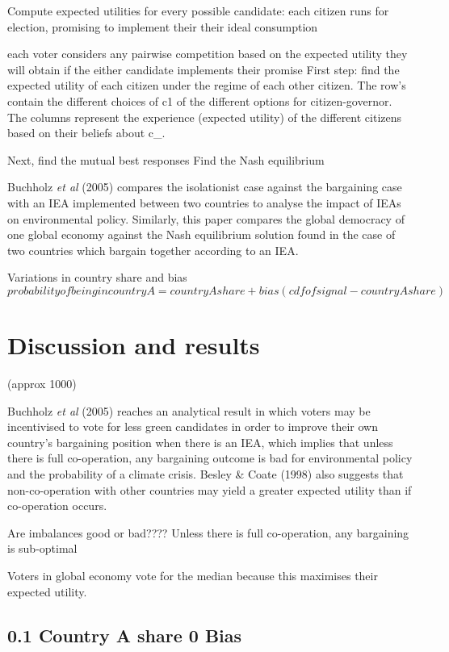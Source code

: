 \documentclass[11pt,preprint, authoryear]{elsarticle}
\numberwithin{equation}{section}
\numberwithin{figure}{section}
\numberwithin{table}{section}
\begin{document}
Compute expected utilities for every possible candidate: each citizen
runs for election, promising to implement their their ideal consumption

each voter considers any pairwise competition based on the expected
utility they will obtain if the either candidate implements their
promise First step: find the expected utility of each citizen under the
regime of each other citizen. The row's contain the different choices of
c1 of the different options for citizen-governor. The columns represent
the experience (expected utility) of the different citizens based on
their beliefs about c\_.

Next, find the mutual best responses Find the Nash equilibrium

Buchholz \emph{et al} (2005) compares the isolationist case against the
bargaining case with an IEA implemented between two countries to analyse
the impact of IEAs on environmental policy. Similarly, this paper
compares the global democracy of one global economy against the Nash
equilibrium solution found in the case of two countries which bargain
together according to an IEA.

Variations in country share and bias
\[probability of being in country A = country A share + bias(cdf of signal - country A share)\]

\hypertarget{discussion-and-results}{%
\section{Discussion and results}\label{discussion-and-results}}

(approx 1000)

Buchholz \emph{et al} (2005) reaches an analytical result in which
voters may be incentivised to vote for less green candidates in order to
improve their own country's bargaining position when there is an IEA,
which implies that unless there is full co-operation, any bargaining
outcome is bad for environmental policy and the probability of a climate
crisis. Besley \& Coate (1998) also suggests that non-co-operation with
other countries may yield a greater expected utility than if
co-operation occurs.

Are imbalances good or bad???? Unless there is full co-operation, any
bargaining is sub-optimal

Voters in global economy vote for the median because this maximises
their expected utility.

\hypertarget{country-a-share-0-bias}{%
\subsection*{0.1 Country A share 0 Bias}\label{country-a-share-0-bias}}
\end{document}
